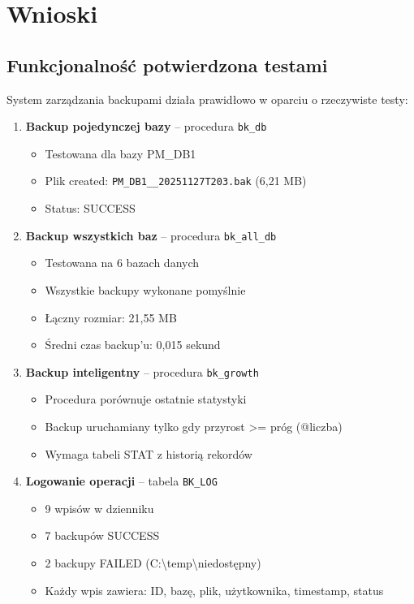 \documentclass[a4paper,11pt]{article}
\begin{document}
	\section{Wnioski}
	
	\subsection{Funkcjonalność potwierdzona testami}
	
	System zarządzania backupami działa prawidłowo w oparciu o rzeczywiste testy:
	
	\begin{enumerate}
		\item \textbf{Backup pojedynczej bazy} -- procedura \texttt{bk\_db}
		\begin{itemize}
			\item Testowana dla bazy PM\_DB1
			\item Plik created: \texttt{PM\_DB1\_\_20251127T203.bak} (6,21 MB)
			\item Status: SUCCESS
		\end{itemize}
		
		\item \textbf{Backup wszystkich baz} -- procedura \texttt{bk\_all\_db}
		\begin{itemize}
			\item Testowana na 6 bazach danych
			\item Wszystkie backupy wykonane pomyślnie
			\item Łączny rozmiar: 21,55 MB
			\item Średni czas backup'u: 0,015 sekund
		\end{itemize}
		
		\item \textbf{Backup inteligentny} -- procedura \texttt{bk\_growth}
		\begin{itemize}
			\item Procedura porównuje ostatnie statystyki
			\item Backup uruchamiany tylko gdy przyrost >= próg (@liczba)
			\item Wymaga tabeli STAT z historią rekordów
		\end{itemize}
		
		\item \textbf{Logowanie operacji} -- tabela \texttt{BK\_LOG}
		\begin{itemize}
			\item 9 wpisów w dzienniku
			\item 7 backupów SUCCESS
			\item 2 backupy FAILED (C:\textbackslash temp\textbackslash niedostępny)
			\item Każdy wpis zawiera: ID, bazę, plik, użytkownika, timestamp, status
		\end{itemize}
		

\end{enumerate}
\end{document}
